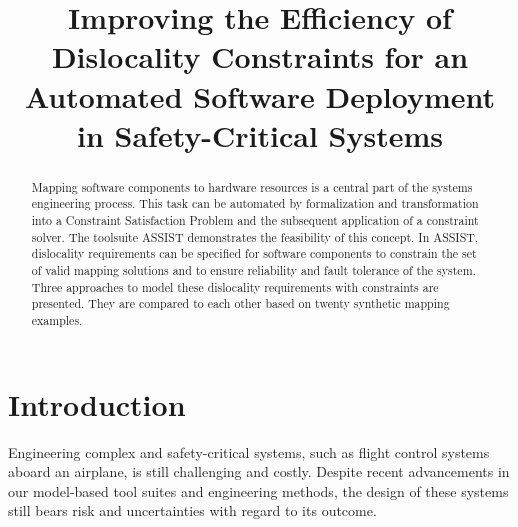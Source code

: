 \documentclass[conference]{IEEEtran}
\begin{document}
\title{Improving the Efficiency of Dislocality Constraints for an Automated Software Deployment in Safety-Critical Systems}

\author{
\and
{}
}

\maketitle

\begin{abstract}
  Mapping software components to hardware resources is a central part of the systems engineering process. 
  This task can be automated by formalization and transformation into a Constraint Satisfaction Problem and the subsequent application of a constraint solver.
  The toolsuite ASSIST demonstrates the feasibility of this concept.
  In ASSIST, dislocality requirements can be specified for software components to constrain the set of valid mapping solutions and to ensure reliability and fault tolerance of the system.
  Three approaches to model these dislocality requirements with constraints are presented.
  They are compared to each other based on twenty synthetic mapping examples.
\end{abstract}


\section{Introduction}

Engineering complex and safety-critical systems, such as flight control systems aboard an airplane, is still challenging and costly.
Despite recent advancements in our model-based tool suites and engineering methods, the design of these systems still bears risk and uncertainties with regard to its outcome.
\end{document}

